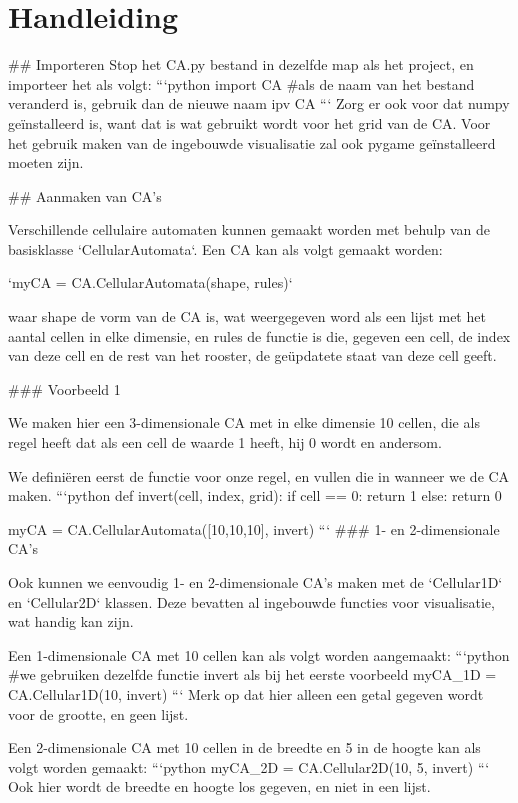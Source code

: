 \documentclass{article}
\begin{document}
\section{Handleiding}
\begin{markdown}


## Importeren
Stop het CA.py bestand in dezelfde map als het project, en importeer het als volgt:
```python
import CA
#als de naam van het bestand veranderd is, gebruik dan de nieuwe naam ipv CA
```
Zorg er ook voor dat numpy geïnstalleerd is, want dat is wat gebruikt wordt voor het grid van de CA. Voor het gebruik maken van de ingebouwde visualisatie zal ook pygame geïnstalleerd moeten zijn.

## Aanmaken van CA's

Verschillende cellulaire automaten kunnen gemaakt worden met behulp van de basisklasse `CellularAutomata`. Een CA kan als volgt gemaakt worden:

`myCA = CA.CellularAutomata(shape, rules)`

waar shape de vorm van de CA is, wat weergegeven word als een lijst met het aantal cellen in elke dimensie, en rules de functie is die, gegeven een cell, de index van deze cell en de rest van het rooster, de geüpdatete staat van deze cell geeft. 

### Voorbeeld 1

We maken hier een 3-dimensionale CA met in elke dimensie 10 cellen, die als regel heeft dat als een cell de waarde 1 heeft, hij 0 wordt en andersom.

We definiëren eerst de functie voor onze regel, en vullen die in wanneer we de CA maken. 
```python
def invert(cell, index, grid):
    if cell == 0:
        return 1
    else:
        return 0

myCA = CA.CellularAutomata([10,10,10], invert)
```
### 1- en 2-dimensionale CA's

Ook kunnen we eenvoudig 1- en 2-dimensionale CA's maken met de  `Cellular1D` en `Cellular2D` klassen. Deze bevatten al ingebouwde functies voor visualisatie, wat handig kan zijn.

Een 1-dimensionale CA met 10 cellen kan als volgt worden aangemaakt:
```python
#we gebruiken dezelfde functie invert als bij het eerste voorbeeld
myCA_1D = CA.Cellular1D(10, invert)
```
Merk op dat hier alleen een getal gegeven wordt voor de grootte, en geen lijst. 

Een 2-dimensionale CA met 10 cellen in de breedte en 5 in de hoogte kan als volgt worden gemaakt:
```python
myCA_2D = CA.Cellular2D(10, 5, invert)
```
Ook hier wordt de breedte en hoogte los gegeven, en niet in een lijst. 


\end{markdown}
\end{document}
